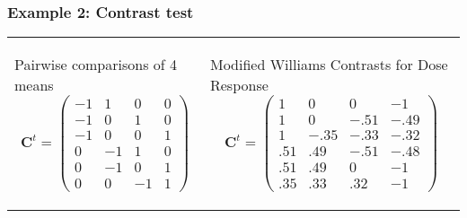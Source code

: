 \documentclass[bigger]{beamer}
\newcommand{\bs}[1]{\bm{#1}}
\begin{document}
\begin{frame}
\frametitle{Example 2: Contrast test}


\begin{tabular}{ll}
 \begin{minipage}{.44\textwidth}
   \begin{block}{\footnotesize Pairwise comparisons of 4 means}
     {\footnotesize
       \begin{displaymath}
         \bs{C}^t = \left(
           \begin{array}{rrrr}
             -1 & 1 & 0 & 0 \\
             -1 & 0 & 1 & 0 \\
             -1 & 0 & 0 & 1 \\
             0 & -1 & 1 & 0 \\
             0 & -1 & 0 & 1 \\
             0 & 0 & -1 & 1
           \end{array}
         \right)
       \end{displaymath}}
   \end{block}
 \end{minipage} &
 \begin{minipage}{.56\textwidth}
\pause
   \begin{block}{\footnotesize Modified Williams Contrasts for Dose Response \cite{bretz2010multiple}}
      {\footnotesize
       \begin{displaymath}
         \bs{C}^t=\left(
           \begin{array}{rrrr}
             1 & 0 & 0 & -1\\
             1 & 0 &-.51 & -.49 \\
             1 & -.35 & -.33 & -.32\\
             .51 & .49 & -.51 & -.48\\
             .51 & .49 & 0 &  -1\\
             .35 & .33 & .32& -1
           \end{array}\right)
       \end{displaymath}}
   \end{block}
 \end{minipage}
\end{tabular}

\end{frame}
\end{document}
